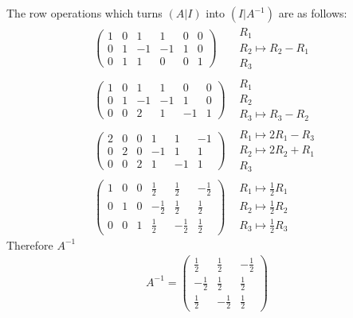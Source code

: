 \documentclass[11pt]{article}
\begin{document}
The row operations which turns $(A|I)$ into $(I|A^{-1})$ are as follows:
\begin{align}
\left(\begin{array}{ccc|ccc}
1 & 0 & 1 & 1 & 0 & 0 \\
0 & 1 & -1 & -1 & 1 & 0 \\
0 & 1 & 1 & 0 & 0 & 1
\end{array}\right)&
\begin{array}{l}
  \text{$R_1$}\\
  \text{$R_2 \longmapsto R_2 - R_1$}\\
  \text{$R_3$ }
\end{array} 
\\
\left(\begin{array}{ccc|ccc}
1 & 0 & 1 & 1 & 0 & 0 \\
0 & 1 & -1 & -1 & 1 & 0 \\
0 & 0 & 2 & 1 & -1 & 1
\end{array}\right)&
\begin{array}{l}
  \text{$R_1$}\\
  \text{$R_2$}\\
  \text{$R_3 \longmapsto R_3 - R_2$ }
\end{array}
\\
\left(\begin{array}{ccc|ccc}
2 & 0 & 0 & 1 & 1 & -1 \\
0 & 2 & 0 & -1 & 1 & 1 \\
0 & 0 & 2 & 1 & -1 & 1
\end{array}\right)&
\begin{array}{l}
  \text{$R_1 \longmapsto 2R_1-R_3$}\\
  \text{$R_2 \longmapsto 2R_2+R_1$}\\
  \text{$R_3$ }
\end{array}
\\
\left(\begin{array}{ccc|ccc}
1 & 0 & 0 & \frac{1}{2} & \frac{1}{2} & -\frac{1}{2} \\
0 & 1 & 0 & -\frac{1}{2} & \frac{1}{2} & \frac{1}{2} \\
0 & 0 & 1 & \frac{1}{2} & -\frac{1}{2} & \frac{1}{2}
\end{array}\right)&
\begin{array}{l}
  \text{$R_1 \longmapsto \frac{1}{2}R_1$}\\
  \text{$R_2 \longmapsto \frac{1}{2}R_2$}\\
  \text{$R_3 \longmapsto \frac{1}{2}R_3$}
\end{array}
\end{align}
Therefore $A^{-1}$
\begin{align}
A^{-1}= \left(\begin{array}{ccc}
\frac{1}{2} & \frac{1}{2} & -\frac{1}{2} \\
-\frac{1}{2} & \frac{1}{2} & \frac{1}{2} \\
\frac{1}{2} & -\frac{1}{2} & \frac{1}{2}
\end{array}\right)
\end{align}
\end{document}
